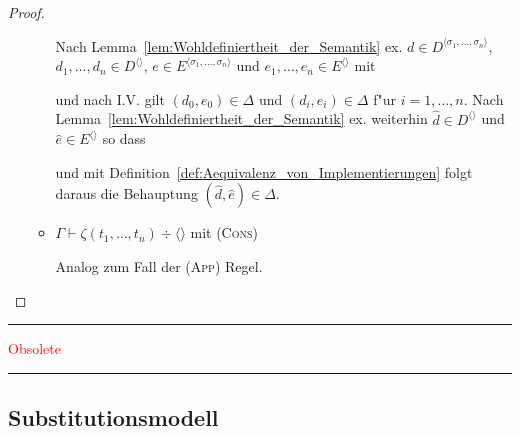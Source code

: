\documentclass[%
  12pt,%
  a4paper,%
]{article}
\newcommand{\Tj}[3]{{#1}\vdash{#2}\div{#3}}
\begin{document}
\begin{proof}
\begin{enumerate}
\begin{itemize}
      Nach Lemma~\ref{lem:Wohldefiniertheit_der_Semantik} ex. $d \in D^{\langle \sigma_1,\ldots,\sigma_n \rangle}$,
      $d_1,\ldots,d_n \in D^{\langle \rangle}$, $e \in E^{\langle \sigma_1,\ldots,\sigma_n \rangle}$ und
      $e_1,\ldots,e_n \in E^{\langle \rangle}$ mit
      und nach I.V. gilt $(d_0,e_0) \in \Delta$ und $(d_i,e_i) \in \Delta$ f"ur $i=1,\ldots,n$.
      Nach Lemma~\ref{lem:Wohldefiniertheit_der_Semantik} ex. weiterhin
      $\hat{d} \in D^{\langle \rangle}$ und $\hat{e} \in E^{\langle \rangle}$ so dass
      und mit Definition~\ref{def:Aequivalenz_von_Implementierungen} folgt daraus die Behauptung
      $(\hat{d},\hat{e}) \in \Delta$.

    \item $\Tj{\Gamma}{\zeta(t_1,\ldots,t_n)}{\langle \rangle}$ mit \textsc{(Cons)}

      Analog zum Fall der \textsc{(App)} Regel.
    \end{itemize}
  \end{enumerate}
\end{proof}


\cleardoublepage

\noindent
\textcolor{red}{
\rule{\textwidth}{2pt}
\vspace*{10pt}
\begin{center}
\mbox{\Huge\sf Obsolete}
\end{center}
\vspace*{10pt}
\rule{\textwidth}{2pt}
}

\subsection*{Substitutionsmodell}
\end{document}
